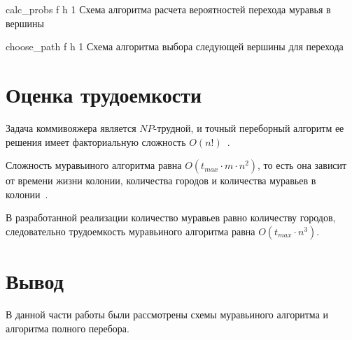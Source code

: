 {calc_probs} %
{f} %
{h} %
{1\textwidth} %
{Схема алгоритма расчета вероятностей перехода муравья в вершины} %

{choose_path} %
{f} %
{h} %
{1\textwidth} %
{Схема алгоритма выбора следующей вершины для перехода} %

\section{Оценка трудоемкости}
Задача коммивояжера является $NP$-трудной, и точный переборный алгоритм ее решения имеет факториальную сложность $O(n!)$~\cite{salesman}. 

Сложность муравьиного алгоритма равна $O(t_{max} \cdot m \cdot n^2)$, то есть она зависит от времени жизни колонии, количества городов и количества муравьев в колонии~\cite{ulyanov}. 

В разработанной реализации количество муравьев равно количеству городов, следовательно трудоемкость муравьиного алгоритма равна $O(t_{max} \cdot n^3)$.

\section*{Вывод}
В данной части работы были рассмотрены схемы муравьиного алгоритма и алгоритма полного перебора.
